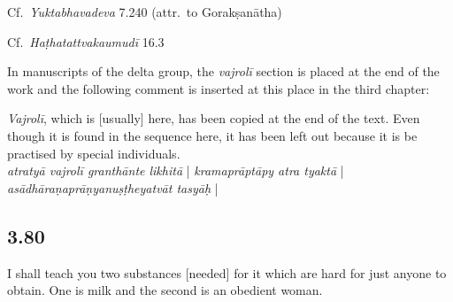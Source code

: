 \begin{ekdosis}
\begin{testimonia}[hp03_079]
Cf.~\emph{Yuktabhavadeva} 7.240 (attr.~to Gorakṣanātha)
\begin{versinnote}
\end{versinnote}


Cf.~\emph{Haṭhatattvakaumudī} 16.3
\begin{versinnote}
\end{versinnote}


\end{testimonia}

\begin{philcomm}[hp03_079]
In manuscripts of the delta group, the \emph{vajrolī} section is placed at the end of the work and the following comment is inserted at this place in the third chapter:
\begin{versinnote}
\emph{Vajrolī}, which is [usually] here, has been copied at the end of the text. Even though it is found in the sequence here, it has been left out because it is be practised by special individuals.\\
\emph{atratyā vajrolī granthānte likhitā} | \emph{kramaprāptāpy atra tyaktā} | \emph{asādhāraṇaprāṇyanuṣṭheyatvāt tasyāḥ} |
\end{versinnote}

\end{philcomm}


\subsection*{3.80}
\begin{translation}[hp03_080]
I shall teach you two substances [needed] for it which are hard for just anyone to obtain. One is milk and the second is an obedient woman.
\end{translation}


\end{ekdosis}
